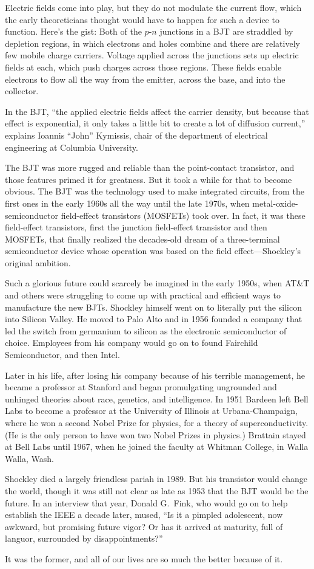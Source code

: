 \documentclass[12pt]{article}
\begin{document}
Electric fields come into play, but they do not modulate the current flow, which the early theoreticians thought would have to happen for such a device to function. Here’s the gist: Both of the $p$-$n$ junctions in a BJT are straddled by depletion regions, in which electrons and holes combine and there are relatively few mobile charge carriers. Voltage applied across the junctions sets up electric fields at each, which push charges across those regions. These fields enable electrons to flow all the way from the emitter, across the base, and into the collector.

In the BJT, ``the applied electric fields affect the carrier density, but because that effect is exponential, it only takes a little bit to create a lot of diffusion current,'' explains Ioannis ``John'' Kymissis, chair of the department of electrical engineering at Columbia University.

The BJT was more rugged and reliable than the point-contact transistor, and those features primed it for greatness. But it took a while for that to become obvious. The BJT was the technology used to make integrated circuits, from the first ones in the early 1960s all the way until the late 1970s, when metal-oxide-semiconductor field-effect transistors (MOSFETs) took over. In fact, it was these field-effect transistors, first the junction field-effect transistor and then MOSFETs, that finally realized the decades-old dream of a three-terminal semiconductor device whose operation was based on the field effect---Shockley’s original ambition.

Such a glorious future could scarcely be imagined in the early 1950s, when AT\&T and others were struggling to come up with practical and efficient ways to manufacture the new BJTs. Shockley himself went on to literally put the silicon into Silicon Valley. He moved to Palo Alto and in 1956 founded a company that led the switch from germanium to silicon as the electronic semiconductor of choice. Employees from his company would go on to found Fairchild Semiconductor, and then Intel.

Later in his life, after losing his company because of his terrible management, he became a professor at Stanford and began promulgating ungrounded and unhinged theories about race, genetics, and intelligence. In 1951 Bardeen left Bell Labs to become a professor at the University of Illinois at Urbana-Champaign, where he won a second Nobel Prize for physics, for a theory of superconductivity. (He is the only person to have won two Nobel Prizes in physics.) Brattain stayed at Bell Labs until 1967, when he joined the faculty at Whitman College, in Walla Walla, Wash.

Shockley died a largely friendless pariah in 1989. But his transistor would change the world, though it was still not clear as late as 1953 that the BJT would be the future. In an interview that year, Donald G.~Fink, who would go on to help establish the IEEE a decade later, mused, ``Is it a pimpled adolescent, now awkward, but promising future vigor? Or has it arrived at maturity, full of languor, surrounded by disappointments?''

It was the former, and all of our lives are so much the better because of it.
\end{document}
